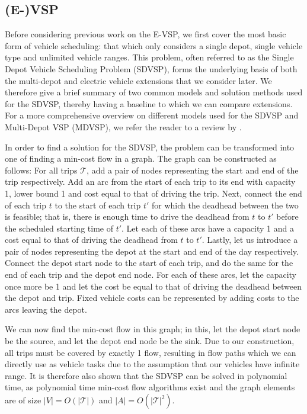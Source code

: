 \documentclass[]{article}
\begin{document}
\subsection{(E-)VSP} \label{sec:evsp-litrev}
Before considering previous work on the E-VSP, we first cover the most basic form of vehicle scheduling: that which only considers a single depot, single vehicle type and unlimited vehicle ranges. This problem, often referred to as the Single Depot Vehicle Scheduling Problem (SDVSP), forms the underlying basis of both the multi-depot and electric vehicle extensions that we consider later. We therefore give a brief summary of two common models and solution methods used for the SDVSP, thereby having a baseline to which we can compare extensions. For a more comprehensive overview on different models used for the SDVSP and Multi-Depot VSP (MDVSP), we refer the reader to a review by \citet{Bunte2009}.

In order to find a solution for the SDVSP, the problem can be transformed into one of finding a min-cost flow in a graph. The graph can be constructed as follows: For all trips $\mathcal{T}$, add a pair of nodes representing the start and end of the trip respectively. Add an arc from the start of each trip to its end with capacity 1, lower bound 1 and cost equal to that of driving the trip. Next, connect the end of each trip $t$ to the start of each trip $t'$ for which the deadhead between the two is feasible; that is, there is enough time to drive the deadhead from $t$ to $t'$ before the scheduled starting time of $t'$. Let each of these arcs have a capacity 1 and a cost equal to that of driving the deadhead from $t$ to $t'$. Lastly, let us introduce a pair of nodes representing the depot at the start and end of the day respectively. Connect the depot start node to the start of each trip, and do the same for the end of each trip and the depot end node. For each of these arcs, let the capacity once more be 1 and let the cost be equal to that of driving the deadhead between the depot and trip. Fixed vehicle costs can be represented by adding costs to the arcs leaving the depot.

We can now find the min-cost flow in this graph; in this, let the depot start node be the source, and let the depot end node be the sink. Due to our construction, all trips must be covered by exactly 1 flow, resulting in flow paths which we can directly use as vehicle tasks due to the assumption that our vehicles have infinite range. It is therefore also shown that the SDVSP can be solved in polynomial time, as polynomial time min-cost flow algorithms exist and the graph elements are of size $|V| = O(|\mathcal{T}|)$ and $|A| = O(|\mathcal{T}|^2)$.
\end{document}
